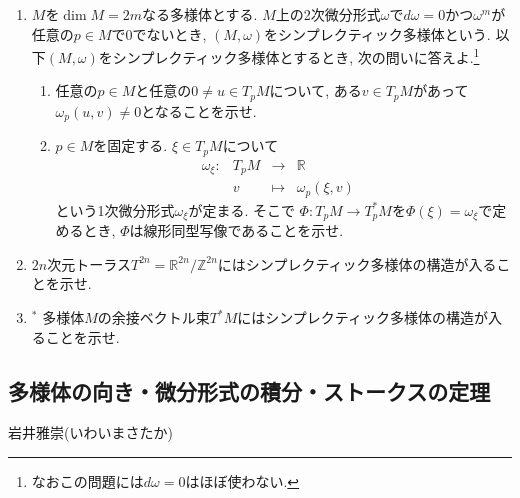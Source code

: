 \documentclass[dvipdfmx,a4paper,11pt]{article}
\newcommand{\R}{\mathbb{R}}
\newcommand{\Z}{\mathbb{Z}}
\theoremstyle{definition}
\begin{document}
\begin{enumerate}[label=\textbf{問}\ref*{sec-mfd-diff}.\arabic*]
\item $M$を$\dim M = 2m$なる多様体とする.
$M$上の2次微分形式$\omega$で$d\omega=0$かつ$\omega^m $が任意の$p \in M$で0でないとき, $(M, \omega)$をシンプレクティック多様体という. 
以下$(M, \omega)$をシンプレクティック多様体とするとき, 次の問いに答えよ.\footnote{なおこの問題には$d\omega=0$はほぼ使わない.}
\begin{enumerate}
 \setlength{\parskip}{0cm}
  \setlength{\itemsep}{2pt} 
  \item 任意の$p \in M$と任意の$0 \neq u \in T_p M$について, ある$v \in T_p M$があって$\omega_p(u,v) \neq 0$となることを示せ. 
  \item $p \in M$を固定する.  $\xi \in T_p M $について
 $$
 \begin{array}{ccccc}
\omega_{\xi} : &T_p M & \rightarrow & \R & \\
&v & \longmapsto & \omega_{p} (\xi,v)&
\end{array}
 $$
 という1次微分形式$\omega_{\xi}$が定まる. そこで
 $\Phi: T_p M  \rightarrow  T_{p}^{*}M $を$\Phi(\xi)=\omega_{\xi} $で定めるとき, $\Phi$は線形同型写像であることを示せ. 
 \end{enumerate}
 

\item $2n$次元トーラス$T^{2n}=\R^{2n}/\Z^{2n}$にはシンプレクティック多様体の構造が入ることを示せ. 

\item $^{*}$ 多様体$M$の余接ベクトル束$T^{*}M$にはシンプレクティック多様体の構造が入ることを示せ. 

\end{enumerate}
\newpage


\begin{center}
\section{多様体の向き・微分形式の積分・ストークスの定理}
\label{sec-stokes}
\end{center}
\begin{flushright}
 岩井雅崇(いわいまさたか)
\end{flushright}
\end{document}
